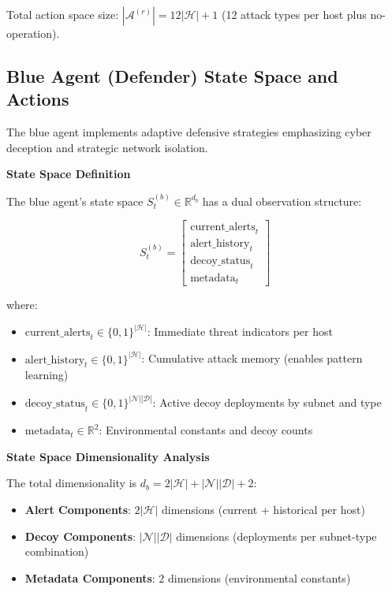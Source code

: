 \documentclass[12pt,oneside]{article}
\begin{document}
Total action space size: $|\mathcal{A}^{(r)}| = 12|\mathcal{H}| + 1$ (12 attack types per host plus no-operation).

\subsection{Blue Agent (Defender) State Space and Actions}

The blue agent implements adaptive defensive strategies emphasizing cyber deception and strategic network isolation.

\textbf{State Space Definition}

The blue agent's state space $S^{(b)}_t \in \mathbb{R}^{d_b}$ has a dual observation structure:

\begin{equation}
S^{(b)}_t = \begin{bmatrix}
\text{current\_alerts}_t \\
\text{alert\_history}_t \\
\text{decoy\_status}_t \\
\text{metadata}_t
\end{bmatrix}
\end{equation}

where:
\begin{itemize}
    \item $\text{current\_alerts}_t \in \{0,1\}^{|\mathcal{H}|}$: Immediate threat indicators per host
    \item $\text{alert\_history}_t \in \{0,1\}^{|\mathcal{H}|}$: Cumulative attack memory (enables pattern learning)
    \item $\text{decoy\_status}_t \in \{0,1\}^{|\mathcal{N}||\mathcal{D}|}$: Active decoy deployments by subnet and type
    \item $\text{metadata}_t \in \mathbb{R}^2$: Environmental constants and decoy counts
\end{itemize}

\textbf{State Space Dimensionality Analysis}

The total dimensionality is $d_b = 2|\mathcal{H}| + |\mathcal{N}||\mathcal{D}| + 2$:

\begin{itemize}
\item \textbf{Alert Components}: $2|\mathcal{H}|$ dimensions (current + historical per host)
\item \textbf{Decoy Components}: $|\mathcal{N}||\mathcal{D}|$ dimensions (deployments per subnet-type combination)  
\item \textbf{Metadata Components}: $2$ dimensions (environmental constants)
\end{itemize}
\end{document}
